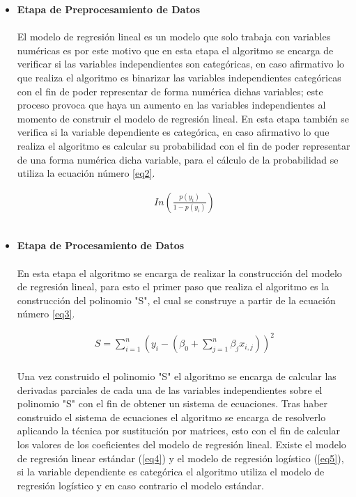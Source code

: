 \documentclass[letterpaper, 10 pt, conference]{ieeeconf}
\begin{document}
\begin{itemize}[leftmargin=*]
    \item \textbf{Etapa de Preprocesamiento de Datos}
    \\ \\ El modelo de regresión lineal es un modelo que solo trabaja con variables numéricas es por este motivo que en esta etapa el algoritmo se encarga de verificar si las variables independientes son categóricas, en caso afirmativo lo que realiza el algoritmo es binarizar las variables independientes categóricas con el fin de poder representar de forma numérica dichas variables; este proceso provoca que haya un aumento en las variables independientes al momento de construir el modelo de regresión lineal. En esta etapa también se verifica si la variable dependiente es categórica, en caso afirmativo lo que realiza el algoritmo es calcular su probabilidad con el fin de poder representar de una forma numérica dicha variable, para el cálculo de la probabilidad se utiliza la ecuación número \ref{eq2}.
    
    \begin{equation} \label{eq2}
    \begin{split}
    In(\frac{p(y_i)}{1-p(y_i)})
    \end{split}
    \end{equation}\\
    
    \item \textbf{Etapa de Procesamiento de Datos}
    \\ \\ En esta etapa el algoritmo se encarga de realizar la construcción del modelo de regresión lineal, para esto el primer paso que realiza el algoritmo es la construcción del polinomio "S", el cual se construye a partir de la ecuación número \ref{eq3}.
    
    \begin{equation} \label{eq3}
    \begin{split}
    S = \sum_{i=1}^{n}(y_i-(\beta_0+\sum_{j=1}^{n}\beta_jx_{i,j}))^2
    \end{split}
    \end{equation}\\
    
    Una vez construido el polinomio "S" el algoritmo se encarga de calcular las derivadas parciales de cada una de las variables independientes sobre el polinomio "S" con el fin de obtener un sistema de ecuaciones. Tras haber construido el sistema de ecuaciones el algoritmo se encarga de resolverlo aplicando la técnica por sustitución por matrices, esto con el fin de calcular los valores de los coeficientes del modelo de regresión lineal. Existe el modelo de regresión linear estándar (\ref{eq4}) y el modelo de regresión logístico (\ref{eq5}), si la variable dependiente es categórica el algoritmo utiliza el modelo de regresión logístico y en caso contrario el modelo estándar.
    

\end{itemize}
\end{document}
